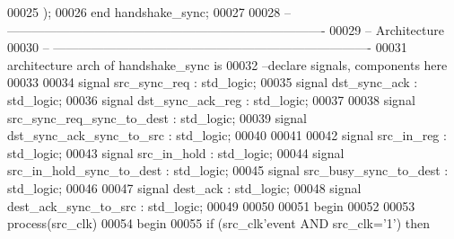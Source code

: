 \begin{DoxyCode}
00025         \textcolor{vhdlchar}{)};
00026 \textcolor{keywordflow}{end} \textcolor{vhdlchar}{handshake\_sync};
00027 
00028 \textcolor{keyword}{-- ----------------------------------------------------------------------------}
00029 \textcolor{keyword}{-- Architecture}
00030 \textcolor{keyword}{-- ----------------------------------------------------------------------------}
00031 \textcolor{keywordflow}{architecture} arch \textcolor{keywordflow}{of} handshake_sync is
00032 \textcolor{keyword}{--declare signals,  components here}
00033 
00034 \textcolor{keywordflow}{signal} \textcolor{vhdlchar}{src_sync_req}              \textcolor{vhdlchar}{:} \textcolor{comment}{std\_logic};
00035 \textcolor{keywordflow}{signal} \textcolor{vhdlchar}{dst_sync_ack}              \textcolor{vhdlchar}{:} \textcolor{comment}{std\_logic};
00036 \textcolor{keywordflow}{signal} \textcolor{vhdlchar}{dst_sync_ack_reg}          \textcolor{vhdlchar}{:} \textcolor{comment}{std\_logic};
00037 
00038 \textcolor{keywordflow}{signal} \textcolor{vhdlchar}{src_sync_req_sync_to_dest} \textcolor{vhdlchar}{:} \textcolor{comment}{std\_logic};
00039 \textcolor{keywordflow}{signal} \textcolor{vhdlchar}{dst_sync_ack_sync_to_src}  \textcolor{vhdlchar}{:} \textcolor{comment}{std\_logic};
00040 
00041 
00042 \textcolor{keywordflow}{signal} \textcolor{vhdlchar}{src_in_reg}                \textcolor{vhdlchar}{:} \textcolor{comment}{std\_logic};
00043 \textcolor{keywordflow}{signal} \textcolor{vhdlchar}{src_in_hold}               \textcolor{vhdlchar}{:} \textcolor{comment}{std\_logic};
00044 \textcolor{keywordflow}{signal} \textcolor{vhdlchar}{src_in_hold_sync_to_dest}  \textcolor{vhdlchar}{:} \textcolor{comment}{std\_logic};
00045 \textcolor{keywordflow}{signal} \textcolor{vhdlchar}{src_busy_sync_to_dest}     \textcolor{vhdlchar}{:} \textcolor{comment}{std\_logic};
00046 
00047 \textcolor{keywordflow}{signal} \textcolor{vhdlchar}{dest_ack}                  \textcolor{vhdlchar}{:} \textcolor{comment}{std\_logic};
00048 \textcolor{keywordflow}{signal} \textcolor{vhdlchar}{dest_ack_sync_to_src}      \textcolor{vhdlchar}{:} \textcolor{comment}{std\_logic};
00049 
00050   
00051 \textcolor{vhdlkeyword}{begin}
00052 
00053 \textcolor{keywordflow}{process}(src_clk)
00054 \textcolor{vhdlkeyword}{begin }
00055 \textcolor{keywordflow}{if} \textcolor{vhdlchar}{(}\textcolor{vhdlchar}{src_clk}\textcolor{vhdlchar}{'}\textcolor{vhdlkeyword}{event} \textcolor{keywordflow}{AND} \textcolor{vhdlchar}{src_clk}\textcolor{vhdlchar}{=}\textcolor{vhdlchar}{'}\textcolor{vhdllogic}{}\textcolor{vhdllogic}{1}\textcolor{vhdlchar}{'}\textcolor{vhdlchar}{)} \textcolor{keywordflow}{then}

\end{DoxyCode}
